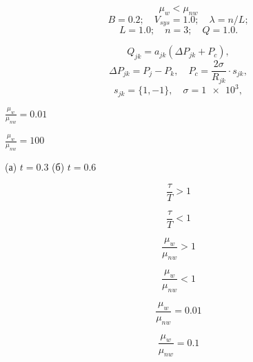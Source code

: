 \[
	\mu_{w} < \mu_{nw}
\]
\[
B = \num{0.2};\quad V_{sys} = \num{1.0};\quad \lambda = n / L;
\]
\[
L = \num{1.0}; \quad n = 3; \quad Q = \num{1.0}.
\]

\[
	Q_{jk} = a_{jk}(\Delta P_{jk} + P_c),
\]
\[  
\Delta P_{jk} = P_j - P_k, \quad P_c = \frac{2 \sigma}{R_{jk}} \cdot s_{jk},
\]
\[
	s_{jk} = \{1, -1\}, \quad \sigma = \num{1e3},
\]

$\frac{\mu_{w}}{\mu_{nw}} = \num{0.01}$ 



$\frac{\mu_{w}}{\mu_{nw}} = \num{100}$ 


(а) $t= \num{0.3}$  (б) $t = \num{0.6}$


\[
	\frac{\tau}{T} > 1
\]

\[
	\frac{\tau}{T} < 1
\]

\[
	\frac{\mu_{w}}{\mu_{nw}} > 1
\]

\[
	\frac{\mu_{w}}{\mu_{nw}} < 1
\]

\[
\frac{\mu_{w}}{\mu_{nw}} = \num{0.01}
\]

\[
\frac{\mu_{w}}{\mu_{nw}} = \num{0.1}
\]

